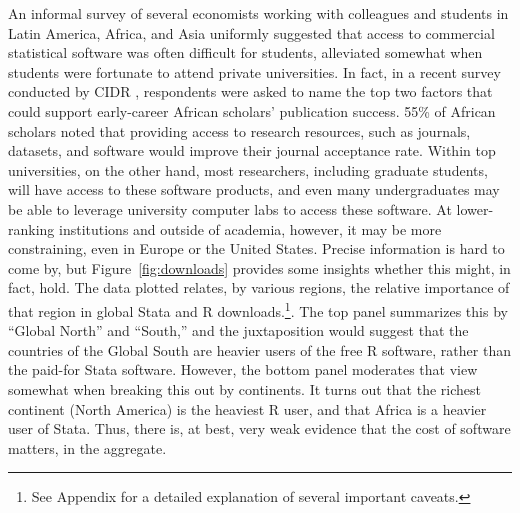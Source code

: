 \documentclass{Revue-economique}
\newcommand{\citep}{\parencite}
\begin{document}
\begin{Article} [%
	Titre={Reproducibility and Open Science in Economics},
	Auteur={Lars Vilhuber\thanks{Cornell University, lars.vilhuber@cornell.edu}}]
\begin{refsection}[Main]
An informal survey of several economists working with colleagues and students in Latin America, Africa, and Asia uniformly suggested that access to commercial statistical software was often difficult for students, alleviated somewhat when students were fortunate to attend private universities. In fact, in a recent survey conducted by CIDR \citep{shipow-cidr}, respondents were asked to name the top two factors that could support early-career African scholars’ publication success. 
55\% of African scholars noted that providing access to research resources, such as journals, datasets, and software would improve their journal acceptance rate.%
%
Within top universities, on the other hand, most researchers, including graduate students, will have access to these software products, and even many undergraduates may be able to leverage university computer labs to access these software. At lower-ranking institutions and outside of academia, however, it may be more constraining, even in Europe or the United States. Precise information is hard to come by, but  Figure~\ref{fig:downloads} provides some insights whether this might, in fact, hold. The data plotted relates, by various regions, the relative importance of that region in global Stata and R downloads.\footnote{See Appendix for a detailed explanation of several important caveats.}. The top panel summarizes this by ``Global North'' and ``South,'' and the juxtaposition would suggest that the countries of the Global South are heavier users of the free R software, rather than the paid-for Stata software. However, the bottom panel moderates that view somewhat when breaking this out by continents. It turns out that the richest continent (North America) is the heaviest R user, and that Africa is a heavier user of Stata. Thus, there is, at best, very weak evidence that the cost of software matters, in the aggregate.  






\end{refsection}
\end{Article}
\end{document}
